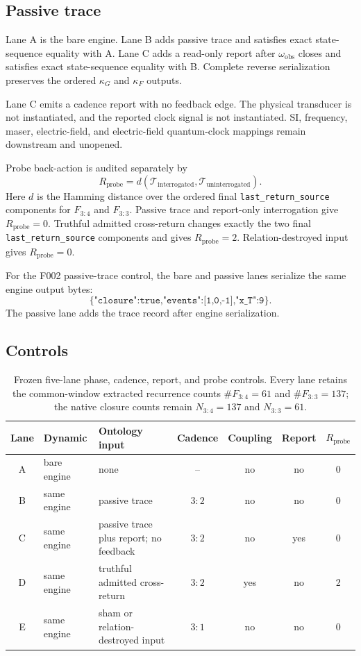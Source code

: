 \subsection{Passive trace}\label{manual:phase-temporal:passive-trace}
Lane A is the bare engine. Lane B adds passive trace and satisfies exact state-sequence equality with A. Lane C adds a read-only report after \(\omega_{\mathrm{obs}}\) closes and satisfies exact state-sequence equality with B. Complete reverse serialization preserves the ordered \(\kappa_G\) and \(\kappa_F\) outputs.

Lane C emits a cadence report with no feedback edge. The physical transducer is not instantiated, and the reported clock signal is not instantiated. SI, frequency, maser, electric-field, and electric-field quantum-clock mappings remain downstream and unopened.

Probe back-action is audited separately by
\[
R_{\mathrm{probe}}
=d\!\left(\mathcal T_{\mathrm{interrogated}},
\mathcal T_{\mathrm{uninterrogated}}\right).
\]
Here \(d\) is the Hamming distance over the ordered final
\texttt{last\_return\_source} components for \(F_{3:4}\) and \(F_{3:3}\).
Passive trace and report-only interrogation give \(R_{\mathrm{probe}}=0\). Truthful admitted cross-return changes exactly the two final \texttt{last\_return\_source} components and gives \(R_{\mathrm{probe}}=2\). Relation-destroyed input gives \(R_{\mathrm{probe}}=0\).

For the F002 passive-trace control, the bare and passive lanes serialize
the same engine output bytes:
\[
\{\texttt{"closure":true,"events":[1,0,-1],"x\_T":9}\}.
\]
The passive lane adds the trace record after engine serialization.

\subsection{Controls}\label{manual:phase-temporal:controls}
\begin{table}[H]
\centering
\small
\caption{Frozen five-lane phase, cadence, report, and probe controls. Every lane retains the common-window extracted recurrence counts \(\#F_{3:4}=61\) and \(\#F_{3:3}=137\); the native closure counts remain \(N_{3:4}=137\) and \(N_{3:3}=61\).}
\begin{tabularx}{\textwidth}{clXcccc}
\toprule
Lane & Dynamic & Ontology input & Cadence & Coupling & Report & \(R_{\mathrm{probe}}\)\\
\midrule
A & bare engine & none & -- & no & no & 0\\
B & same engine & passive trace & \(3{:}2\) & no & no & 0\\
C & same engine & passive trace plus report; no feedback & \(3{:}2\) & no & yes & 0\\
D & same engine & truthful admitted cross-return & \(3{:}2\) & yes & no & 2\\
E & same engine & sham or relation-destroyed input & \(3{:}1\) & no & no & 0\\
\bottomrule
\end{tabularx}
\label{tab:manual-phase-temporal-controls}
\end{table}

